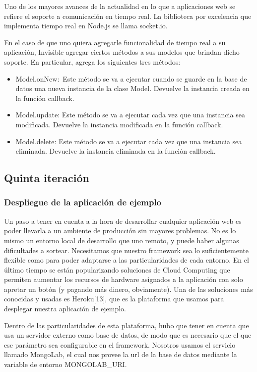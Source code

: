 \documentclass[doc,helv,longtable]{article}
\begin{document}
Uno de los mayores avances de la actualidad en lo que a aplicaciones web se refiere el soporte a comunicación en tiempo real. La biblioteca por excelencia que implementa tiempo real en Node.js se llama socket.io. 

En el caso de que uno quiera agregarle funcionalidad de tiempo real a su aplicación, Invisible agregar ciertos métodos a sus modelos que brindan dicho soporte. En particular, agrega los siguientes tres métodos:


\begin{itemize}
\item  Model.onNew: Este método se va a ejecutar cuando se guarde en la base de datos una nueva instancia de la clase Model. Devuelve la instancia creada en la función callback.
\item  Model.update: Este método se va a ejecutar cada vez que una instancia sea modificada. Devuelve la instancia modificada en la función callback.
\item  Model.delete: Este método se va a ejecutar cada vez que una instancia sea eliminada. Devuelve la instancia eliminada en la función callback.

\end{itemize}
\subsection{Quinta iteración}
\subsubsection{Despliegue de la aplicación de ejemplo}


Un paso a tener en cuenta a la hora de desarrollar cualquier aplicación web es poder llevarla a un ambiente de producción sin mayores problemas. No es lo mismo un entorno local de desarrollo que uno remoto, y puede haber algunas dificultades a sortear. Necesitamos que nuestro framework sea lo suficientemente flexible como para poder adaptarse a las particularidades de cada entorno. En el último tiempo se están popularizando soluciones de Cloud Computing que permiten aumentar los recursos de hardware asignados a la aplicación con solo apretar un botón (y pagando más dinero, obviamente). Una de las soluciones más conocidas y usadas es Heroku[13], que es la plataforma que usamos para desplegar nuestra aplicación de ejemplo. 

Dentro de las particularidades de esta plataforma, hubo que tener en cuenta que usa un servidor externo como base de datos, de modo que es necesario que el que ese parámetro sea configurable en el framework. Nosotros usamos el servicio llamado MongoLab, el cual nos provee la url de la base de datos mediante la variable de entorno MONGOLAB\_URI.
\end{document}
